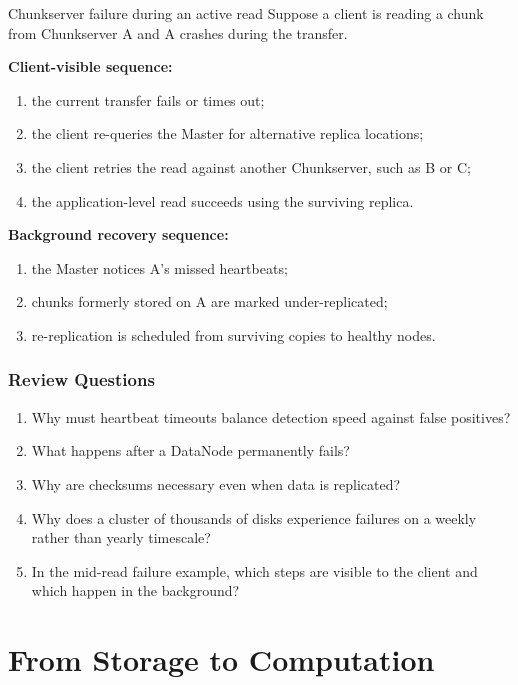 \documentclass[11pt,a4paper,oneside]{book}
\begin{document}
\begin{examplebox}{Chunkserver failure during an active read}
Suppose a client is reading a chunk from Chunkserver A and A crashes during the transfer.

\textbf{Client-visible sequence:}
\begin{enumerate}
    \item the current transfer fails or times out;
    \item the client re-queries the Master for alternative replica locations;
    \item the client retries the read against another Chunkserver, such as B or C;
    \item the application-level read succeeds using the surviving replica.
\end{enumerate}

\textbf{Background recovery sequence:}
\begin{enumerate}
    \item the Master notices A's missed heartbeats;
    \item chunks formerly stored on A are marked under-replicated;
    \item re-replication is scheduled from surviving copies to healthy nodes.
\end{enumerate}
\end{examplebox}

\subsubsection*{Review Questions}
\begin{enumerate}
    \item Why must heartbeat timeouts balance detection speed against false positives?
    \item What happens after a DataNode permanently fails?
    \item Why are checksums necessary even when data is replicated?
    \item Why does a cluster of thousands of disks experience failures on a weekly rather than yearly timescale?
    \item In the mid-read failure example, which steps are visible to the client and which happen in the background?
\end{enumerate}


\section{From Storage to Computation}
\end{document}
